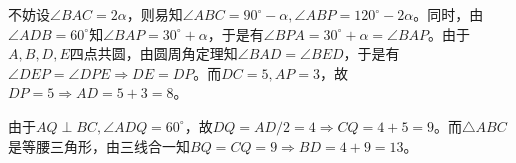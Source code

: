 不妨设$\angle BAC = 2\alpha$，则易知$\angle ABC = 90^\circ - \alpha, \angle ABP = 120^\circ - 2\alpha$。同时，由$\angle ADB = 60^\circ$知$\angle BAP = 30^\circ + \alpha$，于是有$\angle BPA = 30^\circ + \alpha = \angle BAP$。由于$A, B, D, E$四点共圆，由圆周角定理知$\angle BAD = \angle BED$，于是有$\angle DEP = \angle DPE \Rightarrow DE = DP$。而$DC = 5, AP = 3$，故$DP = 5 \Rightarrow AD = 5 + 3 = 8$。

由于$AQ \perp BC, \angle ADQ = 60^\circ$，故$DQ = AD/2 = 4 \Rightarrow CQ = 4 + 5 = 9$。而$\triangle ABC$是等腰三角形，由三线合一知$BQ = CQ = 9 \Rightarrow BD = 4 + 9 = 13$。
